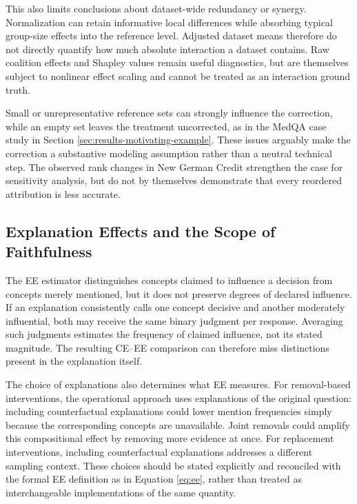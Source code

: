 This also limits conclusions about dataset-wide redundancy or synergy. Normalization can retain informative local differences while absorbing typical group-size effects into the reference level. Adjusted dataset means therefore do not directly quantify how much absolute interaction a dataset contains. Raw coalition effects and Shapley values remain useful diagnostics, but are themselves subject to nonlinear effect scaling and cannot be treated as an interaction ground truth.

Small or unrepresentative reference sets can strongly influence the correction, while an empty set leaves the treatment uncorrected, as in the MedQA case study in Section \ref{sec:results-motivating-example}. These issues arguably make the correction a substantive modeling assumption rather than a neutral technical step. The observed rank changes in New German Credit strengthen the case for sensitivity analysis, but do not by themselves demonstrate that every reordered attribution is less accurate.

\subsection{Explanation Effects and the Scope of Faithfulness}

The EE estimator distinguishes concepts claimed to influence a decision from concepts merely mentioned, but it does not preserve degrees of declared influence. If an explanation consistently calls one concept decisive and another moderately influential, both may receive the same binary judgment per response. Averaging such judgments estimates the frequency of claimed influence, not its stated magnitude. The resulting CE--EE comparison can therefore miss distinctions present in the explanation itself.

The choice of explanations also determines what EE measures. For removal-based interventions, the operational approach uses explanations of the original question: including counterfactual explanations could lower mention frequencies simply because the corresponding concepts are unavailable. Joint removals could amplify this compositional effect by removing more evidence at once. For replacement interventions, including counterfactual explanations addresses a different sampling context. These choices should be stated explicitly and reconciled with the formal EE definition as in Equation \ref{eq:ee}, rather than treated as interchangeable implementations of the same quantity.

